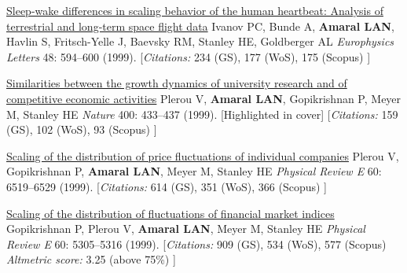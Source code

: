 \NumberedItem{\makebox[0.8cm][r]{[27]}}
\href{/people/amaral/sleep-wake-differences-in-scaling-behavior-of-the-human-heartbeat-analysis-of-terrestrial-and-long-term-space-flight-data}
{Sleep-wake differences in scaling behavior of the human heartbeat: Analysis of terrestrial and long-term space flight data}
\newline
Ivanov PC, Bunde A, {\textbf{Amaral LAN}}, Havlin S, Fritsch-Yelle J, Baevsky RM, Stanley HE, Goldberger AL
\newline
\textit{Europhysics Letters}
    48:
594--600 (1999).
    \newline
    \hfill [{\em{Citations:}} 234 (GS),
    177 (WoS), 175 (Scopus)
    ]
\newline
\Gap
~
\Gap

\NumberedItem{\makebox[0.8cm][r]{[26]}}
\href{/people/amaral/similarities-between-the-growth-dynamics-of-university-research-and-of-competitive-economic-activities}
{Similarities between the growth dynamics of university research and of competitive economic activities}
\newline
Plerou V, {\textbf{Amaral LAN}}, Gopikrishnan P, Meyer M, Stanley HE
\newline
\textit{Nature}
    400:
433--437 (1999).
    [Highlighted in cover]
    \newline
    \hfill [{\em{Citations:}} 159 (GS),
    102 (WoS), 93 (Scopus)
    ]
\newline
\Gap
~
\Gap

\NumberedItem{\makebox[0.8cm][r]{[25]}}
\href{/people/amaral/scaling-of-the-distribution-of-price-fluctuations-of-individual-companies}
{Scaling of the distribution of price fluctuations of individual companies}
\newline
Plerou V, Gopikrishnan P, {\textbf{Amaral LAN}}, Meyer M, Stanley HE
\newline
\textit{Physical Review E}
    60:
6519--6529 (1999).
    \newline
    \hfill [{\em{Citations:}} 614 (GS),
    351 (WoS), 366 (Scopus)
    ]
\newline
\Gap
~
\Gap

\NumberedItem{\makebox[0.8cm][r]{[24]}}
\href{/people/amaral/scaling-of-the-distribution-of-fluctuations-of-financial-market-indices}
{Scaling of the distribution of fluctuations of financial market indices}
\newline
Gopikrishnan P, Plerou V, {\textbf{Amaral LAN}}, Meyer M, Stanley HE
\newline
\textit{Physical Review E}
    60:
5305--5316 (1999).
    \newline
    \hfill [{\em{Citations:}} 909 (GS),
    534 (WoS), 577 (Scopus)
        {\hspace*{1cm} \em{Altmetric score:}}  3.25 (above 75\%)
    ]
\newline
\Gap
~
\Gap


